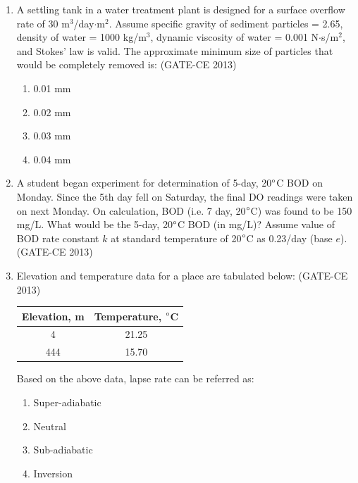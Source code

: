 \documentclass[journal,12pt,onecolumn]{article}
\theoremstyle{remark}
\begin{document}
\begin{enumerate}
    \item A settling tank in a water treatment plant is designed for a surface overflow rate of 30 m$^3$/day$\cdot$m$^2$. Assume specific gravity of sediment particles = 2.65, density of water \brak{\rho} = 1000 kg/m$^3$, dynamic viscosity of water \brak{\mu} = 0.001 N$\cdot$s/m$^2$, and Stokes' law is valid. The approximate minimum size of particles that would be completely removed is: (GATE-CE 2013)
    \begin{multicols}{4}
    \begin{enumerate}
        \item 0.01 mm 
        \item 0.02 mm 
        \item 0.03 mm 
        \item 0.04 mm
    \end{enumerate}
    \end{multicols}
    
    \item A student began experiment for determination of 5-day, 20$\degree$C BOD on Monday. Since the 5th day fell on Saturday, the final DO readings were taken on next Monday. On calculation, BOD (i.e. 7 day, 20$\degree$C) was found to be 150 mg/L. What would be the 5-day, 20$\degree$C BOD (in mg/L)? Assume value of BOD rate constant $k$ at standard temperature of 20$\degree$C as 0.23/day (base $e$). \underline{\hspace{3cm}} (GATE-CE 2013)
    
    \item Elevation and temperature data for a place are tabulated below: (GATE-CE 2013)
    
    \begin{table}[H]
    \centering
    \begin{tabular}{|c|c|}
    \hline
    Elevation, m & Temperature, $\degree$C \\
    \hline
    4 & 21.25 \\
    444 & 15.70 \\
    \hline
    \end{tabular}
    \end{table}
    
    
    Based on the above data, lapse rate can be referred as:
    \begin{multicols}{2}
    \begin{enumerate}
        \item Super-adiabatic 
        \item Neutral 
        \item Sub-adiabatic 
        \item Inversion
    \end{enumerate}
    \end{multicols}
    

\end{enumerate}
\end{document}
